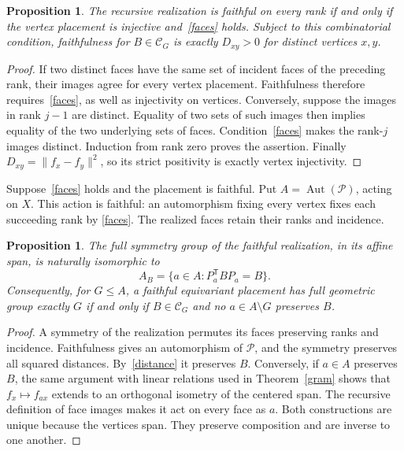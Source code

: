 \documentclass[11pt,a4paper]{article}
\newtheorem{proposition}[theorem]{Proposition}
\newcommand{\Aut}{\operatorname{Aut}}
\begin{document}
\begin{proposition}\label{faithful}
The recursive realization is faithful on every rank if and only if the
vertex placement is injective and~\eqref{faces} holds. Subject to this
combinatorial condition, faithfulness for $B\in\mathcal C_G$ is exactly
$D_{xy}>0$ for distinct vertices $x,y$.
\end{proposition}
\begin{proof}
If two distinct faces have the same set of incident faces of the preceding
rank, their images agree for every vertex placement. Faithfulness therefore
requires~\eqref{faces}, as well as injectivity on vertices. Conversely,
suppose the images in rank $j-1$ are distinct. Equality of two sets of
such images then implies equality of the two underlying sets of faces.
Condition~\eqref{faces} makes the rank-$j$ images distinct. Induction from
rank zero proves the assertion. Finally $D_{xy}=\|f_x-f_y\|^2$, so its
strict positivity is exactly vertex injectivity.
\end{proof}

Suppose~\eqref{faces} holds and the placement is faithful. Put
$A=\Aut(\mathcal P)$, acting on $X$. This action is faithful: an
automorphism fixing every vertex fixes each succeeding rank by
\eqref{faces}. The realized faces retain their ranks and incidence.

\begin{proposition}\label{symmetry}
The full symmetry group of the faithful realization, in its affine span,
is naturally isomorphic to
\[
 A_B=\{a\in A:P_a^{\mathsf T}BP_a=B\}.
\]
Consequently, for $G\leq A$, a faithful equivariant placement has full
geometric group exactly $G$ if and only if $B\in\mathcal C_G$ and no
$a\in A\setminus G$ preserves $B$.
\end{proposition}
\begin{proof}
A symmetry of the realization permutes its faces preserving ranks and
incidence. Faithfulness gives an automorphism of $\mathcal P$, and the
symmetry preserves all squared distances. By~\eqref{distance} it
preserves $B$. Conversely, if $a\in A$ preserves $B$, the same argument
with linear relations used in Theorem~\ref{gram} shows that
$f_x\mapsto f_{ax}$ extends to an orthogonal isometry of the centered
span. The recursive definition of face images makes it act on every
face as $a$. Both constructions are unique because the vertices span.
They preserve composition and are inverse to one another.
\end{proof}
\end{document}
